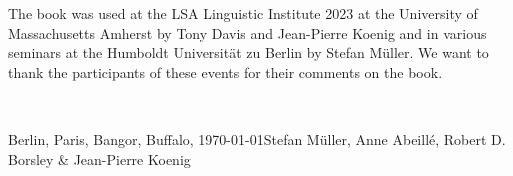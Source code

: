 %
%
%
%
%
%
%
%

The book was used at the LSA Linguistic Institute 2023 at the University of Massachusetts Amherst by
Tony Davis and Jean-Pierre Koenig and in various seminars at the Humboldt
Universität zu Berlin by Stefan Müller. We want to thank the participants of these events for their comments on the book.

~\medskip

\noindent
Berlin, Paris, Bangor, Buffalo, \today\hfill Stefan Müller, Anne Abeillé, Robert D. Borsley \& Jean-​Pierre Koenig


